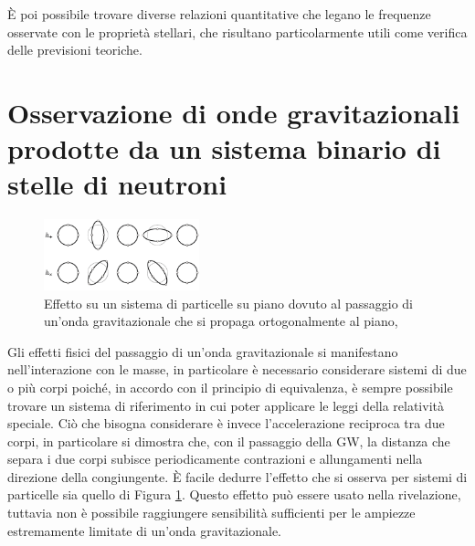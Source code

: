 È poi possibile trovare diverse relazioni quantitative che legano le frequenze osservate con le proprietà stellari, che risultano particolarmente utili come verifica delle previsioni teoriche.

\section[Osservazioni di onde gravtazionali]{Osservazione di onde gravitazionali prodotte da un sistema binario di stelle di neutroni}
\label{chapter:gw170817}
\begin{figure}
	\vspace{-10pt}
	\begin{center}
		\includegraphics[width=0.4\textwidth]{figures/Capitolo_1/gw_effect.png}
	\end{center}
	\vspace{-5pt}
	\caption{Effetto su un sistema di particelle su piano dovuto al passaggio di un'onda gravitazionale che si propaga ortogonalmente al piano, \cite{universe3030059}}
	\label{fig:gweffect}
	\vspace{-10pt}
\end{figure}
Gli effetti fisici del passaggio di un'onda gravitazionale si manifestano nell'interazione con le masse, in particolare è necessario considerare sistemi di due o più corpi poiché, in accordo con il principio di equivalenza, è sempre possibile trovare un sistema di riferimento in cui poter applicare le leggi della relatività speciale. Ciò che bisogna considerare è invece l'accelerazione reciproca tra due corpi, in particolare si dimostra che, con il passaggio della GW, la distanza che separa i due corpi subisce periodicamente contrazioni e allungamenti nella direzione della congiungente.
È facile dedurre l'effetto che si osserva per sistemi di particelle sia quello di Figura \ref{fig:gweffect}. Questo effetto può essere usato nella rivelazione, tuttavia non è possibile raggiungere sensibilità sufficienti per le ampiezze estremamente limitate di un'onda gravitazionale. 

